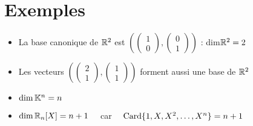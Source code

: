 \section{Exemples}

\begin{frame}
\begin{exemple}
\begin{itemize}
\setlength{\itemsep}{7pt}
  \item La base canonique de $\mathbb{R}^2$ est 
$\left( 
\left(\begin{smallmatrix} 1\\0 \end{smallmatrix}\right),
\left(\begin{smallmatrix} 0\\1 \end{smallmatrix}\right)
\right)$ : dim$\mathbb{R}^2=2$
  
  
  \pause
  \item Les vecteurs $\left(
  \left(\begin{smallmatrix}2\\1\end{smallmatrix}\right),
  \left(\begin{smallmatrix}1\\1\end{smallmatrix}\right) \right)$
  forment aussi une base de $\mathbb{R}^2$  
  
  
  \pause
  \item $\dim \mathbb{K}^n = n$
  
    \pause 
  \item $\dim \mathbb{R}_n[X] = n+1\quad$ car $\quad\mathop{\text{Card}}\nolimits \{1,X,X^2,\ldots,X^n\} = n+1$
  
\end{itemize}
\end{exemple}
\end{frame}


